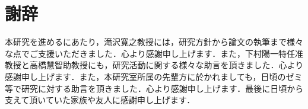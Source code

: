 \section*{謝辞}
本研究を進めるにあたり，滝沢寛之教授には，研究方針から論文の執筆まで様々な点でご支援いただきました．心より感謝申し上げます．また，下村陽一特任准教授と高橋慧智助教授にも，研究活動に関する様々な助言を頂きました．心より感謝申し上げます．また，本研究室所属の先輩方に於かれましても，日頃のゼミ等で研究に対する助言を頂きました．心より感謝申し上げます．最後に日頃から支えて頂いていた家族や友人に感謝申し上げます．\par
{}